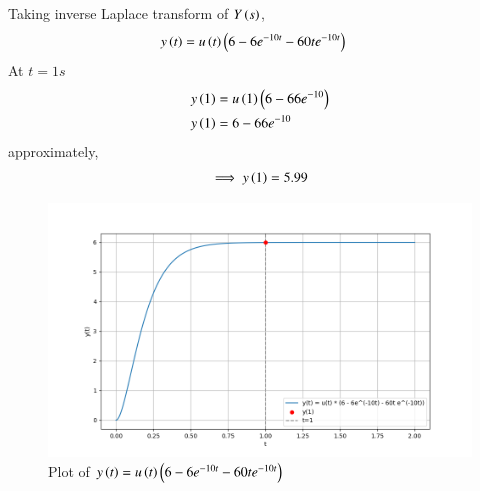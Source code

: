\documentclass[journal,12pt,twocolumn]{IEEEtran}
\theoremstyle{remark}
\begin{document}
    Taking inverse Laplace transform of $Y\left(s\right)$,
    \begin{align}
	    y\left(t\right) &= u\left(t\right) \left(6-6e^{-10t}-60te^{-10t}\right)
    \end{align}
    At $t=1s$ 
    \begin{align}
        y\left(1\right) &=u\left(1\right) \left(6-66e^{-10}\right)\\
        y\left(1\right) &=6-66e^{-10}
    \end{align}
    approximately,
    \begin{align}
	    \implies y\left(1\right) =5.99
    \end{align}
    
   \begin{figure}[h]
    \centering  

\includegraphics[width=\columnwidth]{fig/plot.png}

    \centering
    \caption{Plot of $y\left(t\right) = u\left(t\right) \left(6-6e^{-10t}-60te^{-10t}\right)$}

    \label{fig:}
\end{figure}
\end{document}
